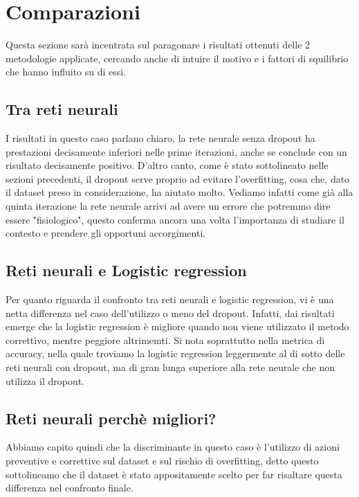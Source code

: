 \section{Comparazioni}
Questa sezione sarà incentrata sul paragonare i risultati ottenuti delle 2 metodologie applicate, cercando anche di intuire il motivo e i fattori di squilibrio che hanno influito su di essi.
\subsection{Tra reti neurali}
I risultati in questo caso parlano chiaro, la rete neurale senza dropout ha prestazioni decisamente inferiori nelle prime iterazioni, anche se conclude con un risultato decisamente positivo. D'altro canto, come è stato sottolineato nelle sezioni precedenti, il dropout serve proprio ad evitare l'overfitting, cosa che, dato il dataset preso in considerazione, ha aiutato molto. Vediamo infatti come già alla quinta iterazione la rete neurale arrivi ad avere un errore che potremmo dire essere "fisiologico", questo conferma ancora una volta l'importanza di studiare il contesto e prendere gli opportuni accorgimenti.
\subsection{Reti neurali e Logistic regression}
Per quanto riguarda il confronto tra reti neurali e logistic regression, vi è una netta differenza nel caso dell'utilizzo o meno del dropout. Infatti, dai risultati emerge che la logistic regression è migliore quando non viene utilizzato il metodo correttivo, mentre peggiore altrimemti. Si nota soprattutto nella metrica di accuracy, nella quale troviamo la logistic regression leggermente al di sotto delle reti neurali con dropout, ma di gran lunga superiore alla rete neurale che non utilizza il dropout.
\subsection{Reti neurali perchè migliori?}
Abbiamo capito quindi che la discriminante in questo caso è l'utilizzo di azioni preventive e correttive sul dataset e sul rischio di overfitting, detto questo sottolineamo che il dataset è stato appositamente scelto per far risaltare questa differenza nel confronto finale.

